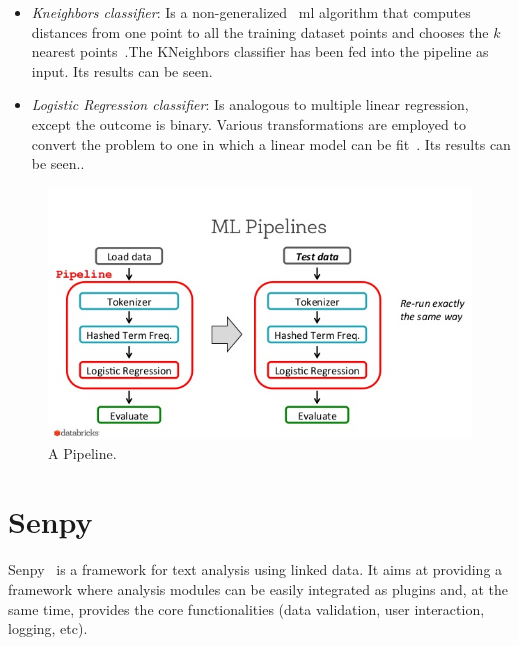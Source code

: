\begin{itemize}
	\item \textit{Kneighbors classifier}: Is a non-generalized ~\ac{ml} algorithm that computes distances from one point to all the training dataset points and chooses the $k$ nearest points~\cite{knn1}.The KNeighbors classifier has been  fed into the pipeline as input. Its results can be seen.
	\item \textit{Logistic Regression classifier}: Is analogous to multiple linear regression, except the outcome is binary. Various transformations are employed to convert the problem to one in which a linear model can be fit~\cite{lr1}. Its results can be seen..
\end{itemize}

\begin{figure}
	\includegraphics[width=\linewidth]{img/pipeline1.png}
	\caption{A Pipeline.~\cite{pipeline}}
	\label{fig:pipeline}
\end{figure}

\section{Senpy}
Senpy~\cite{senpy} is a framework for text analysis using linked data. It aims at providing a framework where analysis modules can be easily integrated as plugins and, at the same time, provides the core functionalities (data validation, user interaction, logging, etc).


